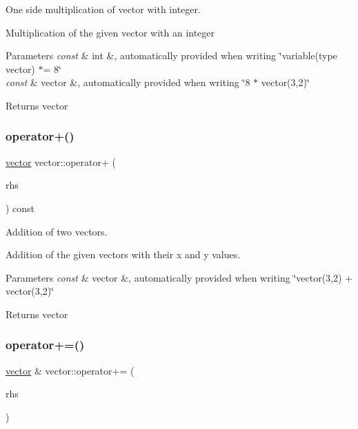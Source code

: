 One side multiplication of vector with integer. 

Multiplication of the given vector with an integer 
\begin{DoxyParams}{Parameters}
{\em const} & int \&, automatically provided when writing \char`\"{}variable(type vector) $\ast$= 8\char`\"{} \\
\hline
{\em const} & vector \&, automatically provided when writing \char`\"{}8 $\ast$ vector(3,2)\char`\"{} \\
\hline
\end{DoxyParams}
\begin{DoxyReturn}{Returns}
vector 
\end{DoxyReturn}
\mbox{\label{classvector_a25f3bec51c3c238f516d6efc12a83ddc}} 
\subsubsection{\texorpdfstring{operator+()}{operator+()}}
{\footnotesize\ttfamily \hyperlink{classvector}{vector} vector\+::operator+ (\begin{DoxyParamCaption}\item[{const \hyperlink{classvector}{vector} \&}]{rhs }\end{DoxyParamCaption}) const}



Addition of two vectors. 

Addition of the given vectors with their x and y values. 
\begin{DoxyParams}{Parameters}
{\em const} & vector \&, automatically provided when writing \char`\"{}vector(3,2) + vector(3,2)\char`\"{} \\
\hline
\end{DoxyParams}
\begin{DoxyReturn}{Returns}
vector 
\end{DoxyReturn}
\mbox{\label{classvector_aaf697df4ba3936748875757f0e0ce62a}} 
\subsubsection{\texorpdfstring{operator+=()}{operator+=()}}
{\footnotesize\ttfamily \hyperlink{classvector}{vector} \& vector\+::operator+= (\begin{DoxyParamCaption}\item[{const \hyperlink{classvector}{vector} \&}]{rhs }\end{DoxyParamCaption})}



